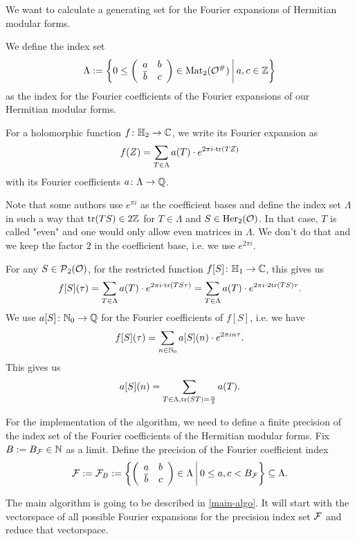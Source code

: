 \begin{prelim}
We want to calculate a generating set for the Fourier expansions of Hermitian modular forms.

We define the index set
\[ \Lambda := \Set{0 \le \SimpleMatrix{a}{b}{\overline b}{c} \in \M_2(\curlO^\#)}{a,c \in \Z } \]
as the index for the Fourier coefficients of the Fourier expansions of our Hermitian modular forms.

For a holomorphic function $f \colon \mathbb{H}_2 \rightarrow \mathbb{C}$, we write its Fourier expansion as
\[ f(Z) = \sum_{T \in \Lambda} a(T) \cdot e^{2 \pi i \cdot \textup{\textrm{tr}}(T Z)} \]
with its Fourier coefficients $a \colon \Lambda \rightarrow \mathbb{Q}$.

Note that some authors use $e^{\pi i}$ as the coefficient bases and define the index set $\Lambda$ in such a way that $\textup{\textrm{tr}}(TS) \in 2\mathbb{Z}$ for $T \in \Lambda$ and $S \in \operatorname{Her}_2(\mathcal{O})$. In that case, $T$ is called "even" and one would only allow even matrices in $\Lambda$. We don't do that and we keep the factor $2$ in the coefficient base, i.e. we use $e^{2 \pi i}$.
\end{prelim}

\begin{remark}
\label{remark:restricted-by-S}
For any $S \in \operatorname{\mathcal{P}}_2(\mathcal{O})$, for the restricted function $f[S] \colon \mathbb{H}_1 \rightarrow \mathbb{C}$, this gives us
\[ f[S](\tau) = \sum_{T \in \Lambda} a(T) \cdot e^{2 \pi i \cdot \textup{\textrm{tr}}(T S \tau)}
= \sum_{T \in \Lambda} a(T) \cdot e^{2 \pi i \cdot 2 \textup{\textrm{tr}}(T S) \tau} . \]
We use $a[S] \colon \mathbb{N}_0 \rightarrow \mathbb{Q}$ for the Fourier coefficients of $f[S]$, i.e. we have
\[ f[S](\tau) = \sum_{n \in \mathbb{N}_0} a[S](n) \cdot e^{2 \pi i n \tau} . \]
This gives us
\[ a[S] (n) = \sum_{T \in \Lambda, \textup{\textrm{tr}}(S T) = \frac{n}{2}} a(T) . \]
\endproof
\end{remark}

For the implementation of the algorithm, we need to define a finite precision of the index set of the Fourier coefficients of the Hermitian modular forms.
Fix $B := B_{\mathcal{F}} \in \mathbb{N}$ as a limit. Define the precision of the Fourier coefficient index
\[ \F := \F_B := \Set{\SimpleMatrix{a}{b}{\overline b}{c} \in \Lambda}{0 \le a , c < B_{\F}} \subseteq \Lambda . \]

The main algorithm is going to be described in \cref{main-algo}. It will start with the vectorspace of all possible Fourier expansions for the precision index set $\mathcal{F}$ and reduce that vectorspace.

